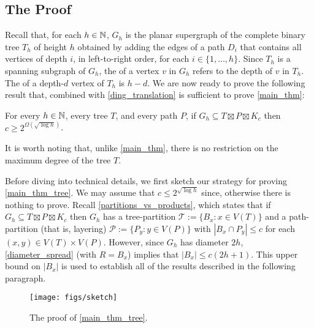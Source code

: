\documentclass{patmorin}
\newcommand\subsetcong{\mathrel{\text{%
    \setbox0\hbox{$\subseteq$}%
    \rlap{\hbox to \wd0{\hss\hss\hss\raisebox{1.5\height}{$\sim$}\hss}}\box0
}}}
\renewcommand{\subsetcong}{\subseteq}
\renewcommand{\le}{\leqslant}
\renewcommand{\ge}{\geqslant}
\begin{document}
\subsection{The Proof}

Recall that, for each $h\in\mathbb{N}$, $G_{h}$ is the planar supergraph of the complete binary tree $T_h$ of height $h$ obtained by adding the edges of a path $D_i$ that contains all vertices of depth $i$, in left-to-right order, for each $i\in\{1,\ldots,h\}$.   Since $T_h$ is a spanning subgraph of $G_h$, the  of a vertex $v$ in $G_h$ refers to the depth of $v$ in $T_h$.  The  of a depth-$d$ vertex of $T_h$ is $h-d$.
We are now ready to prove the following result that, combined with \cref{ding_translation} is sufficient to prove \cref{main_thm}:

\begin{thm}\label{main_thm_tree}
  For every $h\in\mathbb{N}$, every tree $T$, and every path $P$, if $G_{h}\subsetcong T\boxtimes P\boxtimes K_c$ then $c\ge 2^{\Omega(\sqrt{\log h})}$.
\end{thm}

It is worth noting that, unlike \cref{main_thm}, there is no restriction on the maximum degree of the tree $T$.

Before diving into technical details, we first sketch our strategy for proving \cref{main_thm_tree}.  We may assume that $c \le 2^{\sqrt{\log h}}$ since, otherwise there is nothing to prove.  Recall \cref{partitions_vs_products}, which states that if $G_h\subsetcong T\boxtimes P\boxtimes K_c$ then $G_h$ has a tree-partition $\mathcal{T}:=\{B_x:x\in V(T)\}$ and a path-partition (that is, layering) $\mathcal{P}:=\{P_y:y\in V(P)\}$ with $|B_x\cap P_y|\le c$ for each $(x,y)\in V(T)\times V(P)$. However, since $G_h$ has diameter $2h$, \cref{diameter_spread} (with $R=B_x$) implies that $|B_x|\le c(2h+1)$. This upper bound on $|B_x|$ is used to establish all of the results described in the following paragraph.

\begin{figure}
  \begin{center}
    \texttt{[image: figs/sketch]}
  \end{center}
  \caption{The proof of \cref{main_thm_tree}.}
  \label{sketch}
\end{figure}
\end{document}
